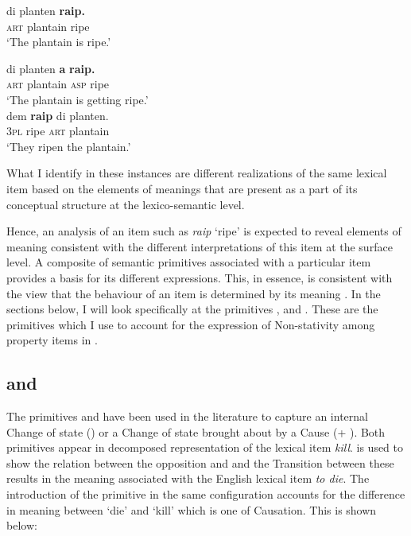 \ea%
\label{ex:4:10}
\ea
\gll di planten \textbf{raip.}\\
\textsc{art} plantain ripe\\
\glt `The plantain is ripe.'

\ex
\gll di planten \textbf{a} \textbf{raip.} \\
\textsc{art} plantain \textsc{asp} ripe\\
\glt  `The plantain is getting ripe.'\\


\ex
\gll dem \textbf{raip} di planten.\\
\textsc{3pl} ripe \textsc{art} plantain\\
\glt  `They ripen the plantain.' \\
\z \z

What I identify in these instances are different realizations of the
same lexical item based on the elements of meanings that are present
as a part of its conceptual structure at the lexico-semantic level.

Hence, an analysis of an item such as \textit{raip} `ripe' is expected
to reveal elements of meaning consistent with the different
interpretations of this item at the surface level.  A composite of
semantic primitives associated with a particular item provides a basis
for its different expressions.  This, in essence, is consistent with the
view that the behaviour of an item is determined by its meaning
\citep[1]{Levin1993}.  In the sections below, I will look
specifically at the primitives \BECOME, \CAUSE and \DO.  These are the
primitives which I use to account for the expression of Non-stativity
among property items in .

\subsection{\BECOME and \CAUSE}\label{sec:4.3.1}

The primitives \BECOME and \CAUSE have been used in the literature to
capture an internal Change of state (\BECOME) or a Change of state
brought about by a Cause (\CAUSE + \BECOME).  Both primitives appear in
 decomposed representation of the lexical item
\textit{kill}. \BECOME is used to show the relation between the opposition
\ALIVE and \DEAD and the Transition between these results in the
meaning associated with the English lexical item \textit{to die}.  The
introduction of the primitive \CAUSE in the same configuration accounts
for the difference in meaning between `die' and `kill' which is one of
Causation.  This is shown below:

